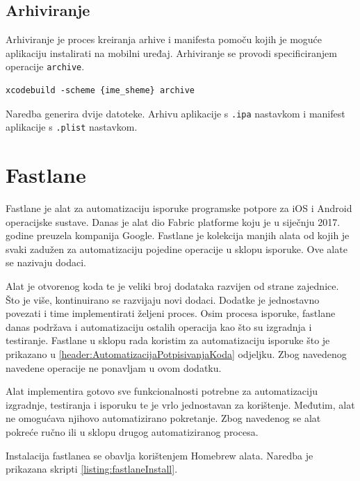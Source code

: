 \documentclass[times, utf8, diplomski, numeric]{fer}
\begin{document}
\begin{appendices}
\section{Arhiviranje}

Arhiviranje je proces kreiranja arhive i manifesta pomoču kojih je moguće aplikaciju instalirati na mobilni uređaj. Arhiviranje se provodi specificiranjem operacije \verb|archive|.

\begin{lstlisting}[caption=Pokretanje operaije arhiviranja korištenjem xcodebuild alata]
xcodebuild -scheme {ime_sheme} archive
\end{lstlisting}

Naredba generira dvije datoteke. Arhivu aplikacije s \verb|.ipa| nastavkom i manifest aplikacije s \verb|.plist| nastavkom.



\chapter{Fastlane} \label{header:dodatak_fastlane}

Fastlane je alat za automatizaciju isporuke programske potpore za iOS i Android operacijske sustave. Danas je alat dio Fabric platforme koju je u siječnju 2017. godine preuzela kompanija Google. Fastlane je kolekcija manjih alata od kojih je svaki zadužen za automatizaciju pojedine operacije u sklopu isporuke. Ove alate se nazivaju dodaci\citep{fastlane}.

Alat je otvorenog koda te je veliki broj dodataka razvijen od strane zajednice. Što je više, kontinuirano se razvijaju novi dodaci. Dodatke je jednostavno povezati i time implementirati željeni proces. Osim procesa isporuke, fastlane danas podržava i automatizaciju ostalih operacija kao što su izgradnja i testiranje. Fastlane u sklopu rada koristim za automatizaciju isporuke što je prikazano u \ref{header:AutomatizacijaPotpisivanjaKoda} odjeljku. Zbog navedenog navedene operacije ne ponavljam u ovom dodatku.

Alat implementira gotovo sve funkcionalnosti potrebne za automatizaciju izgradnje, testiranja i isporuku te je vrlo jednostavan za korištenje. Međutim, alat ne omogućava njihovo automatizirano pokretanje. Zbog navedenog se alat pokreće ručno ili u sklopu drugog automatiziranog procesa.

Instalacija fastlanea se obavlja korištenjem Homebrew alata. Naredba je prikazana skripti \ref{listing:fastlaneInstall}.


\end{appendices}
\end{document}
